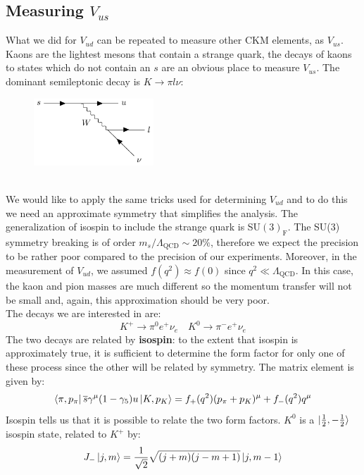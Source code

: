 \documentclass[../main.tex]{subfiles}
\begin{document}
\subsection{Measuring $V_{us}$}
What we did for $V_{ud}$ can be repeated to measure other CKM elements, as $V_{us}$. Kaons are the lightest mesons that contain a strange quark, the decays of kaons to states which do not contain an $s$ are an obvious place to measure $V_{us}$. The dominant semileptonic decay is $K\to\pi l\nu$:\\
\begin{figure}[h]
    \centering
    \includegraphics[width=0.4\textwidth]{Images/kaondecay.pdf}
    \caption*{}
\end{figure}\\
We would like to apply the same tricks used for determining $V_{ud}$ and to do this we need an approximate symmetry that simplifies the analysis. The generalization of isospin to include the strange quark is SU$(3)_{\text{F}}$. The SU(3) symmetry breaking is of order $m_s/\Lambda_{\text{QCD}}\sim20\%$, therefore we expect the precision to be rather poor compared to the precision of our experiments. Moreover, in the measurement of $V_{ud}$, we assumed $f(q^2)\approx f(0)$ since $q^2\ll\Lambda_{\text{QCD}}$. In this case, the kaon and pion masses are much different so the momentum transfer will not be small and, again, this approximation should be very poor.\\
The decays we are interested in are:
\[
K^+\to\pi^0e^+\nu_e \quad K^0\to\pi^-e^+\nu_e
\]
The two decays are related by \textbf{isospin}: to the extent that isospin is approximately true, it is sufficient to determine the form factor for only one of these process since the other will be related by symmetry. The matrix element is given by:
\[
\bra{\pi,p_\pi}\overline{s}\gamma^\mu(1-\gamma_5)u\ket{K,p_K}=f_+(q^2)(p_\pi+p_K)^\mu+f_-(q^2)q^\mu
\]
Isospin tells us that it is possible to relate the two form factors. $K^0$ is a $\ket{\frac{1}{2},-\frac{1}{2}}$ isospin state, related to $K^+$ by:
\[
J_-\ket{j,m}=\frac{1}{\sqrt{2}}\sqrt{(j+m)(j-m+1)}\ket{j,m-1}
\]
\end{document}
